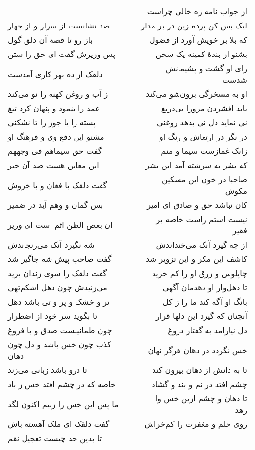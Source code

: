 \begin{center}
\begin{longtable}{l p{0.5cm} r}
&&
از جواب نامه ره خالی چراست
\\
صد نشانست از سرار و از جهار
&&
لیک بس کن پرده زین در بر مدار
\\
باز رو تا قصهٔ آن دلق گول
&&
که بلا بر خویش آورد از فضول
\\
پس وزیرش گفت ای حق را ستن
&&
بشنو از بندهٔ کمینه یک سخن
\\
دلقک از ده بهر کاری آمدست
&&
رای او گشت و پشیمانش شدست
\\
ز آب و روغن کهنه را نو می‌کند
&&
او به مسخرگی برون‌شو می‌کند
\\
غمد را بنمود و پنهان کرد تیغ
&&
باید افشردن مرورا بی‌دریغ
\\
پسته را یا جوز را تا نشکنی
&&
نی نماید دل نی بدهد روغنی
\\
مشنو این دفع وی و فرهنگ او
&&
در نگر در ارتعاش و رنگ او
\\
گفت حق سیماهم فی وجههم
&&
زانک غمازست سیما و منم
\\
این معاین هست ضد آن خبر
&&
که بشر به سرشته آمد این بشر
\\
گفت دلقک با فغان و با خروش
&&
صاحبا در خون این مسکین مکوش
\\
بس گمان و وهم آید در ضمیر
&&
کان نباشد حق و صادق ای امیر
\\
ان بعض الظن اثم است ای وزیر
&&
نیست استم راست خاصه بر فقیر
\\
شه نگیرد آنک می‌رنجاندش
&&
از چه گیرد آنک می‌خنداندش
\\
گفت صاحب پیش شه جاگیر شد
&&
کاشف این مکر و این تزویر شد
\\
گفت دلقک را سوی زندان برید
&&
چاپلوس و زرق او را کم خرید
\\
می‌زنیدش چون دهل اشکم‌تهی
&&
تا دهل‌وار او دهدمان آگهی
\\
تر و خشک و پر و تی باشد دهل
&&
بانگ او آگه کند ما را ز کل
\\
تا بگوید سر خود از اضطرار
&&
آنچنان که گیرد این دلها قرار
\\
چون طمانینست صدق و با فروغ
&&
دل نیارامد به گفتار دروغ
\\
کذب چون خس باشد و دل چون دهان
&&
خس نگردد در دهان هرگز نهان
\\
تا درو باشد زبانی می‌زند
&&
تا به دانش از دهان بیرون کند
\\
خاصه که در چشم افتد خس ز باد
&&
چشم افتد در نم و بند و گشاد
\\
ما پس این خس را زنیم اکنون لگد
&&
تا دهان و چشم ازین خس وا رهد
\\
گفت دلقک ای ملک آهسته باش
&&
روی حلم و مغفرت را کم‌خراش
\\
تا بدین حد چیست تعجیل نقم

\end{longtable}
\end{center}
